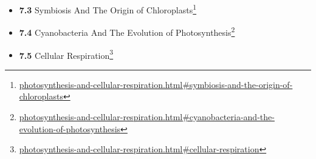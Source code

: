 \documentclass[
]{article}
\providecommand{\tightlist}{%
  \setlength{\itemsep}{0pt}\setlength{\parskip}{0pt}}
\providecommand{\tightlist}{%
  \setlength{\itemsep}{0pt}\setlength{\parskip}{0pt}}
\let\rmarkdownfootnote\footnote%
\def\footnote{\protect\rmarkdownfootnote}
\renewcommand{\href}[2]{#2\footnote{\url{#1}}}
\theoremstyle{definition}
\theoremstyle{definition}
\theoremstyle{definition}
\theoremstyle{remark}
\begin{document}
\begin{itemize}
\begin{itemize}
    \begin{itemize}
    \tightlist
    \item
      \href{photosynthesis-and-cellular-respiration.html\#photosynthetic-membranes-and-organelles}{\emph{}\textbf{7.2.1}
      Photosynthetic Membranes And Organelles}
    \item
      \href{photosynthesis-and-cellular-respiration.html\#z-scheme}{\emph{}\textbf{7.2.2}
      Z Scheme}
    \item
      \href{photosynthesis-and-cellular-respiration.html\#water-photolysis}{\emph{}\textbf{7.2.3}
      Water Photolysis}
    \item
      \href{photosynthesis-and-cellular-respiration.html\#calvin-cycle}{\emph{}\textbf{7.2.4}
      Calvin Cycle}
    \item
      \href{photosynthesis-and-cellular-respiration.html\#carbon-dioxide-levels-and-photorespiration}{\emph{}\textbf{7.2.5}
      Carbon Dioxide Levels And Photorespiration}
    \item
      \href{photosynthesis-and-cellular-respiration.html\#c4-carbon-fixation}{\emph{}\textbf{7.2.6}
      C4 Carbon Fixation}
    \item
      \href{photosynthesis-and-cellular-respiration.html\#cam-photosynthesis}{\emph{}\textbf{7.2.7}
      CAM Photosynthesis}
    \end{itemize}
  \item
    \href{photosynthesis-and-cellular-respiration.html\#symbiosis-and-the-origin-of-chloroplasts}{\emph{}\textbf{7.3}
    Symbiosis And The Origin of Chloroplasts}
  \item
    \href{photosynthesis-and-cellular-respiration.html\#cyanobacteria-and-the-evolution-of-photosynthesis}{\emph{}\textbf{7.4}
    Cyanobacteria And The Evolution of Photosynthesis}
  \item
    \href{photosynthesis-and-cellular-respiration.html\#cellular-respiration}{\emph{}\textbf{7.5}
    Cellular Respiration}


\end{itemize}
\end{itemize}
\end{document}
